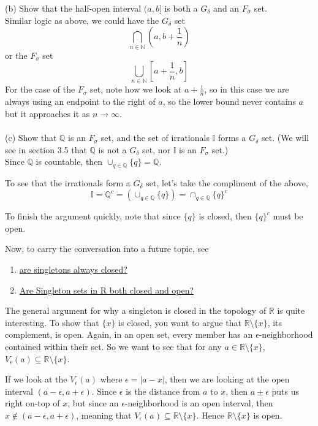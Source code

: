 (b) Show that the half-open interval $(a,b]$ is both a $G_\delta$ and an $F_\sigma$ set.
\\

Similar logic as above, we could have the $G_\delta$ set
$$
\bigcap_{n\in\mathbb{N}} \left( a, b+\frac{1}{n} \right)
$$
or the $F_\sigma$ set
$$
\bigcup_{n\in\mathbb{N}} \left[ a+\frac{1}{n}, b \right]
$$
For the case of the $F_\sigma$ set, note how we look at $a + \frac{1}{n}$, so in this case we are always
using an endpoint to the right of $a$, so the lower bound never contains $a$ but it approaches it as $n\rightarrow\infty$.
\\~\\


(c) Show that $\mathbb{Q}$ is an $F_\sigma$ set, and the set of irrationals $\mathbb{I}$ forms a $G_\delta$ set.
(We will see in section 3.5 that $\mathbb{Q}$ is not a $G_\delta$ set, nor $\mathbb{I}$ is an $F_\sigma$ set.)
\\

Since $\mathbb{Q}$ is countable, then $\cup_{q\in\mathbb{Q}} \{q\} = \mathbb{Q}$.

To see that the irrationals form a $G_\delta$ set, let's take the compliment of the above,
$$
\mathbb{I} = \mathbb{Q}^c = \left( \cup_{q\in\mathbb{Q}} \{q\}  \right) = \cap_{q\in\mathbb{Q}} \{q\}^c
$$

To finish the argument quickly, note that since $\{q\}$ is closed, then $\{q\}^c$ must be open.

Now, to carry the conversation into a future topic, see
\begin{enumerate}
    \item \href{https://math.stackexchange.com/questions/1459067/are-singletons-always-closed}{are singletons always closed?}
    \item \href{https://math.stackexchange.com/questions/17649/are-singleton-sets-in-mathbbr-both-closed-and-open}{Are Singleton sets in R both closed and open?}
\end{enumerate}

The general argument for why a singleton is closed in the topology of $\mathbb{R}$ is quite interesting.
To show that $\{x\}$ is closed, you want to argue that $\mathbb{R}\setminus\{x\}$, its complement, is open.
Again, in an open set, every member has an $\epsilon$-neighborhood contained within their set.
So we want to see that for any $a\in\mathbb{R}\setminus\{x\}$, $V_\epsilon (a) \subseteq \mathbb{R}\setminus\{x\}$.

If we look at the $V_\epsilon (a)$ where $\epsilon = |a - x|$, then we are looking at the open interval
$(a-\epsilon, a+\epsilon)$.
Since $\epsilon$ is the distance from $a$ to $x$, then $a \pm \epsilon$ puts us right on-top of $x$,
but since an $\epsilon$-neighborhood is an open interval, then $x \not\in (a-\epsilon, a+\epsilon)$,
meaning that $V_\epsilon (a) \subseteq \mathbb{R}\setminus\{x\}$.
Hence $\mathbb{R}\setminus\{x\}$ is open.

